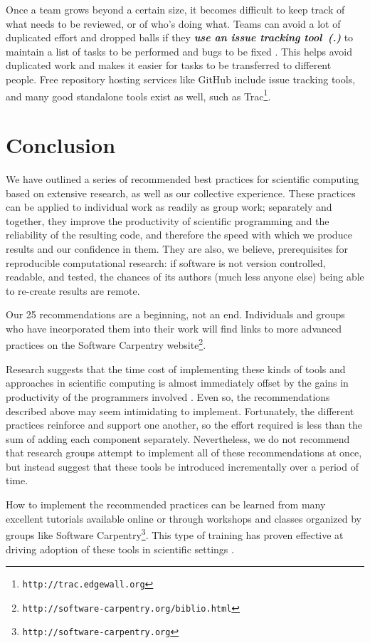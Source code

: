 \documentclass[10pt]{article}
\newcommand{\footurl}[1]{\footnote{\texttt{#1}}}
\newcounter{PracticeIdentifier}[section]
\newcommand{\practice}[1]{\stepcounter{PracticeIdentifier}\textbf{\emph{{#1}~(\arabic{section}.\arabic{PracticeIdentifier})}}}
\begin{document}
Once a team grows beyond a certain size, it becomes difficult to keep
track of what needs to be reviewed, or of who's doing what.  Teams can
avoid a lot of duplicated effort and dropped balls if they
\practice{use an issue tracking tool} to maintain a list of tasks to
be performed and bugs to be fixed \cite{dubois2003a}. This helps avoid
duplicated work and makes it easier for tasks to be transferred to
different people. Free repository hosting services like GitHub include
issue tracking tools, and many good standalone tools exist as well,
such as Trac\footurl{http://trac.edgewall.org}.

\section{Conclusion}\label{conclusion}

We have outlined a series of recommended best practices for scientific
computing based on extensive research, as well as our collective
experience.  These practices can be applied to individual work as
readily as group work; separately and together, they improve the
productivity of scientific programming and the reliability of the
resulting code, and therefore the speed with which we produce results
and our confidence in them.  They are also, we believe, prerequisites
for reproducible computational research: if software is not version
controlled, readable, and tested, the chances of its authors (much less anyone else)
being able to re-create results are remote.

Our 25 recommendations are a beginning, not an end.  Individuals and
groups who have incorporated them into their work will find links to
more advanced practices on the Software Carpentry
website\footurl{http://software-carpentry.org/biblio.html}.

Research suggests that the time cost of implementing these kinds of
tools and approaches in scientific computing is almost immediately
offset by the gains in productivity of the programmers involved
\cite{aranda2012}. Even so, the recommendations described above may
seem intimidating to implement.  Fortunately, the different practices
reinforce and support one another, so the effort required is less than
the sum of adding each component separately. Nevertheless, we do not
recommend that research groups attempt to implement all of these
recommendations at once, but instead suggest that these tools be
introduced incrementally over a period of time.

How to implement the recommended practices can be learned from many
excellent tutorials available online or through workshops and classes
organized by groups like Software
Carpentry\footurl{http://software-carpentry.org}. This type of
training has proven effective at driving adoption of these tools in
scientific settings \cite{aranda2012,wilson2013}.
\end{document}

